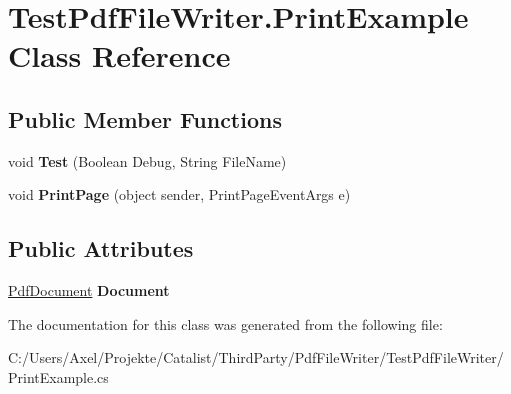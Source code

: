 \hypertarget{class_test_pdf_file_writer_1_1_print_example}{}\section{Test\+Pdf\+File\+Writer.\+Print\+Example Class Reference}
\label{class_test_pdf_file_writer_1_1_print_example}
\subsection*{Public Member Functions}
\begin{DoxyCompactItemize}
\item 
void {\bfseries Test} (Boolean Debug, String File\+Name)\hypertarget{class_test_pdf_file_writer_1_1_print_example_a0be8413bb256c7bf54c1c123cf06b3e6}{}\label{class_test_pdf_file_writer_1_1_print_example_a0be8413bb256c7bf54c1c123cf06b3e6}

\item 
void {\bfseries Print\+Page} (object sender, Print\+Page\+Event\+Args e)\hypertarget{class_test_pdf_file_writer_1_1_print_example_afdfee09968f0ade0af8b9be640cec5ad}{}\label{class_test_pdf_file_writer_1_1_print_example_afdfee09968f0ade0af8b9be640cec5ad}

\end{DoxyCompactItemize}
\subsection*{Public Attributes}
\begin{DoxyCompactItemize}
\item 
\hyperlink{class_pdf_file_writer_1_1_pdf_document}{Pdf\+Document} {\bfseries Document}\hypertarget{class_test_pdf_file_writer_1_1_print_example_a927c932f5d6a4ee31e23e08121d51958}{}\label{class_test_pdf_file_writer_1_1_print_example_a927c932f5d6a4ee31e23e08121d51958}

\end{DoxyCompactItemize}


The documentation for this class was generated from the following file\+:\begin{DoxyCompactItemize}
\item 
C\+:/\+Users/\+Axel/\+Projekte/\+Catalist/\+Third\+Party/\+Pdf\+File\+Writer/\+Test\+Pdf\+File\+Writer/Print\+Example.\+cs\end{DoxyCompactItemize}
